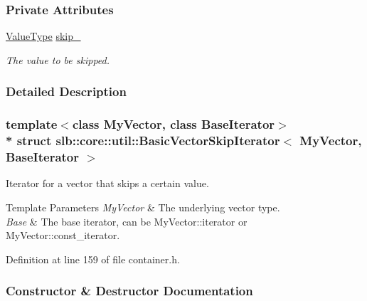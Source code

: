 \subsubsection*{Private Attributes}
\begin{DoxyCompactItemize}
\item 
\hyperlink{structslb_1_1core_1_1util_1_1BasicVectorSkipIterator_afa39da0ab694b51d0abd089e7612a763}{Value\+Type} \hyperlink{structslb_1_1core_1_1util_1_1BasicVectorSkipIterator_ae135631575e5e7b7275e26163f4a55d0}{skip\+\_\+}\hypertarget{structslb_1_1core_1_1util_1_1BasicVectorSkipIterator_ae135631575e5e7b7275e26163f4a55d0}{}\label{structslb_1_1core_1_1util_1_1BasicVectorSkipIterator_ae135631575e5e7b7275e26163f4a55d0}

\begin{DoxyCompactList}\small\item\em The value to be skipped. \end{DoxyCompactList}\end{DoxyCompactItemize}


\subsubsection{Detailed Description}
\subsubsection*{template$<$class My\+Vector, class Base\+Iterator$>$\\*
struct slb\+::core\+::util\+::\+Basic\+Vector\+Skip\+Iterator$<$ My\+Vector, Base\+Iterator $>$}

Iterator for a vector that skips a certain value. 


\begin{DoxyTemplParams}{Template Parameters}
{\em My\+Vector} & The underlying vector type. \\
\hline
{\em Base} & The base iterator, can be My\+Vector\+::iterator or My\+Vector\+::const\+\_\+iterator. \\
\hline
\end{DoxyTemplParams}


Definition at line 159 of file container.\+h.



\subsubsection{Constructor \& Destructor Documentation}
